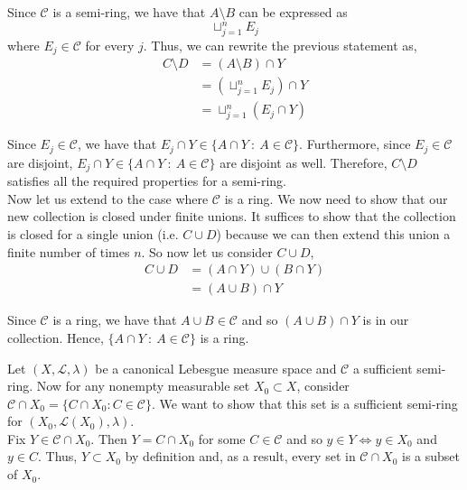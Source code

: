 \documentclass[12pt]{article}
\newenvironment{problem}[2][Problem]{\begin{trivlist}
\item[\hskip \labelsep {\bfseries #1}\hskip \labelsep {\bfseries #2.}]}{\end{trivlist}}
\begin{document}
Since $\mathcal{C}$ is a semi-ring, we have that $A \setminus B$ can be expressed as $$\sqcup_{j=1}^n E_j$$ where $E_j \in \mathcal{C}$ for every $j$. Thus, we can rewrite the previous statement as,
\begin{align*}
C \setminus D &= (A \setminus B) \cap Y\\
&= (\sqcup_{j=1}^n E_j) \cap Y\\
&= \sqcup_{j=1}^n (E_j \cap Y)
\end{align*}

Since $E_j \in \mathcal{C}$, we have that $E_j \cap Y \in \{A \cap Y \ : \ A \in \mathcal{C} \}$. Furthermore, since $E_j \in \mathcal{C}$ are disjoint, $E_j \cap Y \in \{A \cap Y \ : \ A \in \mathcal{C} \}$ are disjoint as well. Therefore, $C \setminus D$ satisfies all the required properties for a semi-ring.\\

Now let us extend to the case where $\mathcal{C}$ is a ring. We now need to show that our new collection is closed under finite unions. It suffices to show that the collection is closed for a single union (i.e. $C \cup D$) because we can then extend this union a finite number of times $n$. So now let us consider $C \cup D$,
\begin{align*}
C \cup D &= (A \cap Y) \cup (B \cap Y)\\
&= (A \cup B) \cap Y
\end{align*}

Since $\mathcal{C}$ is a ring, we have that $A \cup B \in \mathcal{C}$ and so $(A \cup B) \cap Y$ is in our collection. Hence, $\{A \cap Y \ : \ A \in \mathcal{C} \}$ is a ring.

\begin{problem}{2}
\end{problem}

Let $(X, \mathcal{L}, \lambda)$ be a canonical Lebesgue measure space and $\mathcal{C}$ a sufficient semi-ring. Now for any nonempty measurable set $X_0 \subset X$, consider $\mathcal{C} \cap X_0 = \{C \cap X_0 : C \in \mathcal{C}\}$. We want to show that this set is a sufficient semi-ring for $(X_0, \mathcal{L}(X_0), \lambda)$.\\

Fix $Y \in \mathcal{C} \cap X_0$. Then $Y = C \cap X_0$ for some $C \in \mathcal{C}$ and so $y \in Y \iff y \in X_0$ and $y \in C$. Thus, $Y \subset X_0$ by definition and, as a result, every set in $\mathcal{C} \cap X_0$ is a subset of $X_0$.\\
\end{document}
